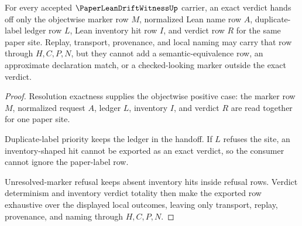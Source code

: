 \begin{theorem}
\label{thm:paper-lean-drift-witness-objectwise-drift-handoff}
For every accepted $\PaperLeanDriftWitnessUp$ carrier, an exact verdict hands off only the objectwise marker row $M$, normalized Lean name row $A$, duplicate-label ledger row $L$, Lean inventory hit row $I$, and verdict row $R$ for the same paper site. Replay, transport, provenance, and local naming may carry that row through $H,C,P,N$, but they cannot add a semantic-equivalence row, an approximate declaration match, or a checked-looking marker outside the exact verdict.
\end{theorem}
\begin{proof}
Resolution exactness supplies the objectwise positive case: the marker row $M$, normalized request $A$, ledger $L$, inventory $I$, and verdict $R$ are read together for one paper site.

Duplicate-label priority keeps the ledger in the handoff. If $L$ refuses the site, an inventory-shaped hit cannot be exported as an exact verdict, so the consumer cannot ignore the paper-label row.

Unresolved-marker refusal keeps absent inventory hits inside refusal rows. Verdict determinism and inventory verdict totality then make the exported row exhaustive over the displayed local outcomes, leaving only transport, replay, provenance, and naming through $H,C,P,N$.
\end{proof}


